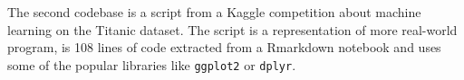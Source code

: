 The second codebase is a script from a Kaggle competition about machine learning on the Titanic dataset\cite{titanic}. The script is a representation of more real-world program, is 108 lines of code extracted from a Rmarkdown notebook and uses some of the popular libraries like \texttt{ggplot2} or \texttt{dplyr}.


